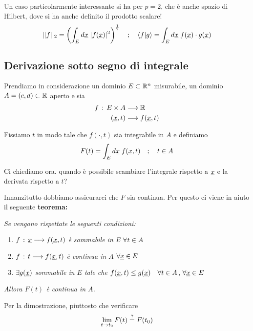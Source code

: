 Un caso particolarmente interessante si ha per $p=2$, che è anche spazio di Hilbert, dove si ha anche definito il prodotto scalare!
\begin{align}
	||f||_2= \left(\int_{E} d\underline{x} \; |f(\underline{x})|^2 \right)^{\frac{1}{2}} \quad ; \quad \braket{f|g} = \int_{E} d\underline{x} \; f(\underline{x})\cdot g(\underline{x})
\end{align}

\subsection{Derivazione sotto segno di integrale}

Prendiamo in considerazione un dominio $E\subset \mathbb{R}^n$ misurabile, un dominio $A=(c,d)\subset \mathbb{R}$ aperto e sia
\begin{align}
	f \, : \, E \times A {}& \longrightarrow \mathbb{R}\\
	(\underline{x},t) & \longrightarrow f(\underline{x},t) \nonumber
\end{align}

Fissiamo $t$ in modo tale che $f(\cdot , t)$ sia integrabile in $A$ e definiamo
\begin{align}
	F(t)= \int_{E} d\underline{x} \; f(\underline{x},t) \quad ; \quad t\in A
\end{align}

Ci chiediamo ora. quando è possibile scambiare l'integrale rispetto a $\underline{x}$ e la derivata rispetto a $t$? 

Innanzitutto dobbiamo assicurarci che $F$ sia continua. Per questo ci viene in aiuto il seguente \textbf{teorema:}

\bigskip

\textit{Se vengono rispettate le seguenti condizioni:}
\begin{enumerate}
	\item $f \, : \, \underline{x} \longrightarrow f(\underline{x},t)$ \textit{è sommabile in E $\forall t \in A$}
	\item $f \, : \, t \longrightarrow f(\underline{x},t)$ \textit{è continua \qo in $A$ $\forall \underline{x} \in E$}
	\item $\exists g(\underline{x})$ \textit{sommabile in $E$ tale che $f(\underline{x},t)\leq g(\underline{x}) \quad \forall t \in A \, , \, \forall \underline{x} \in E$ \qo}
\end{enumerate}

\textit{Allora $F(t)$ è continua in $A$.}

\bigskip

Per la dimostrazione, piuttosto che verificare
\begin{align}
	\underset{t \rightarrow t_0}{\lim} \, F(t) \overset{?}{=} F(t_0)
\end{align}

